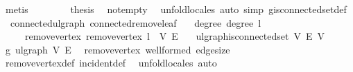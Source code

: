 \begin{isabellebody}
\ metis\isanewline
\ \ \isamarkupfalse%
\isanewline
\ \ \isamarkupfalse%
\ \isamarkupfalse%
\ {\isacharquery}{\kern0pt}thesis\ \isamarkupfalse%
\ not{\isacharunderscore}{\kern0pt}empty\ \isamarkupfalse%
\ {\isacharparenleft}{\kern0pt}unfold{\isacharunderscore}{\kern0pt}locales{\isacharcomma}{\kern0pt}\ auto\ simp{\isacharcolon}{\kern0pt}\ g{\isacharprime}{\kern0pt}{\isachardot}{\kern0pt}is{\isacharunderscore}{\kern0pt}connected{\isacharunderscore}{\kern0pt}set{\isacharunderscore}{\kern0pt}def{\isacharparenright}{\kern0pt}\isanewline
{}\isamarkupfalse%
%
\endisatagproof
{\isafoldproof}%
%
\isadelimproof
\isanewline
%
\endisadelimproof
\isanewline
{}\isamarkupfalse%
\ {\isacharparenleft}{\kern0pt}\ connected{\isacharunderscore}{\kern0pt}ulgraph{\isacharparenright}{\kern0pt}\ connected{\isacharunderscore}{\kern0pt}remove{\isacharunderscore}{\kern0pt}leaf{\isacharcolon}{\kern0pt}\isanewline
\ \ \ degree{\isacharcolon}{\kern0pt}\ {\isachardoublequoteopen}degree\ l\ {\isacharequal}{\kern0pt}\ {}{\isachardoublequoteclose}\isanewline
\ \ \ \ \ remove{\isacharunderscore}{\kern0pt}vertex{\isacharcolon}{\kern0pt}\ {\isachardoublequoteopen}remove{\isacharunderscore}{\kern0pt}vertex\ l\ {\isacharequal}{\kern0pt}\ {\isacharparenleft}{\kern0pt}V{\isacharprime}{\kern0pt}{\isacharcomma}{\kern0pt}\ E{\isacharprime}{\kern0pt}{\isacharparenright}{\kern0pt}{\isachardoublequoteclose}\isanewline
\ \ \ {\isachardoublequoteopen}ulgraph{\isachardot}{\kern0pt}is{\isacharunderscore}{\kern0pt}connected{\isacharunderscore}{\kern0pt}set\ V{\isacharprime}{\kern0pt}\ E{\isacharprime}{\kern0pt}\ V{\isacharprime}{\kern0pt}{\isachardoublequoteclose}\isanewline
%
\isadelimproof
%
\endisadelimproof
%
\isatagproof
{}\isamarkupfalse%
{\isacharminus}{\kern0pt}\isanewline
\ \ \isamarkupfalse%
\ g{\isacharprime}{\kern0pt}{\isacharcolon}{\kern0pt}\ ulgraph\ V{\isacharprime}{\kern0pt}\ E{\isacharprime}{\kern0pt}\ \isamarkupfalse%
\ remove{\isacharunderscore}{\kern0pt}vertex\ wellformed\ edge{\isacharunderscore}{\kern0pt}size\isanewline
\ \ \ \ \isamarkupfalse%
\ remove{\isacharunderscore}{\kern0pt}vertex{\isacharunderscore}{\kern0pt}def\ incident{\isacharunderscore}{\kern0pt}def\ \isamarkupfalse%
\ {\isacharparenleft}{\kern0pt}unfold{\isacharunderscore}{\kern0pt}locales{\isacharcomma}{\kern0pt}\ auto{\isacharparenright}{\kern0pt}\isanewline

\end{isabellebody}
